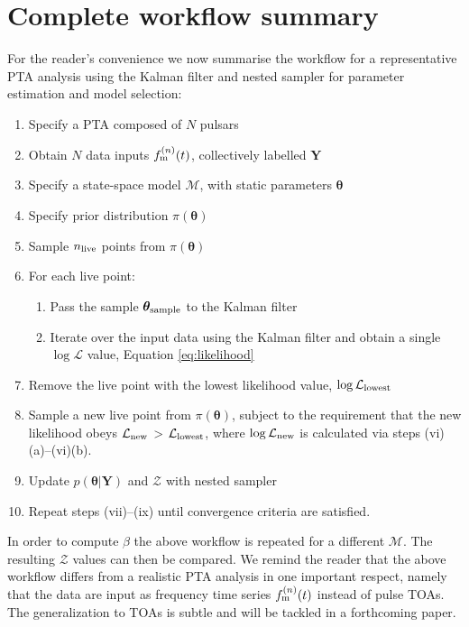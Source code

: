 \documentclass[fleqn,usenatbib,useAMS]{mnras}
\begin{document}
\section{Complete workflow summary}\label{sec:workflow}
For the reader's convenience we now summarise the workflow for a representative PTA analysis using the Kalman filter and nested sampler for parameter estimation and model selection:
\begin{enumerate}[leftmargin=2em]
	\item Specify a PTA composed of $N$ pulsars 
	\item Obtain $N$ data inputs $f_{\rm m}^{(n)}(t)$, collectively labelled $\boldsymbol{Y}$
	\item Specify a state-space model $\mathcal{M}$, with static parameters $\boldsymbol{\theta}$
	\item Specify prior distribution $\pi(\boldsymbol{\theta})$
	\item Sample $n_{\rm live}$ points from $\pi(\boldsymbol{\theta})$ 
	\item For each live point:
	\begin{enumerate}[leftmargin=2em]
		\item Pass the sample $\boldsymbol{\theta}_{\rm sample}$ to the Kalman filter
		\item Iterate over the input data using the Kalman filter and obtain a single $\log \mathcal{L}$ value, Equation \eqref{eq:likelihood}
	\end{enumerate}
	\item Remove the live point with the lowest likelihood value, $\log \mathcal{L}_{\rm lowest}$
	\item Sample a new live point from $\pi(\boldsymbol{\theta})$, subject to the requirement that the new likelihood obeys $\mathcal{L}_{\rm new}$ > $\mathcal{L}_{\rm lowest}$, where $\log \mathcal{L}_{\rm new}$ is calculated via steps (vi)(a)--(vi)(b).
	\item Update $p\left(\boldsymbol{\theta}|\boldsymbol{Y}\right)$ and $\mathcal{Z}$ with nested sampler
	\item Repeat steps (vii)--(ix) until convergence criteria are satisfied.
\end{enumerate}
In order to compute $\beta$ the above workflow is repeated for a different $\mathcal{M}$. The resulting $\mathcal{Z}$ values can then be compared. We remind the reader that the above workflow differs from a realistic PTA analysis in one important respect, namely that the data are input as frequency time series $f_{\rm m}^{(n)}(t)$ instead of pulse TOAs. The generalization to TOAs is subtle and will be tackled in a forthcoming paper.
\end{document}
